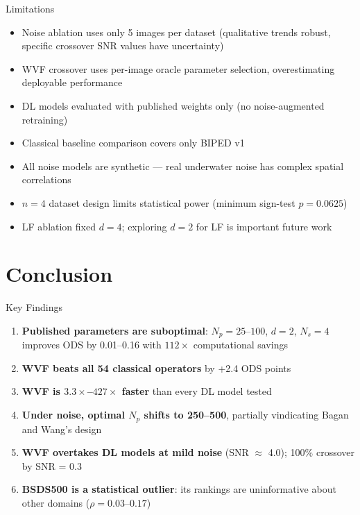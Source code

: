 \documentclass[10pt, aspectratio=169]{beamer}
\begin{document}
\begin{frame}{Limitations}
  \begin{itemize}
    \item Noise ablation uses only 5 images per dataset (qualitative trends robust, specific crossover SNR values have uncertainty)
    \item WVF crossover uses per-image oracle parameter selection, overestimating deployable performance
    \item DL models evaluated with published weights only (no noise-augmented retraining)
    \item Classical baseline comparison covers only BIPED v1
    \item All noise models are synthetic --- real underwater noise has complex spatial correlations
    \item $n = 4$ dataset design limits statistical power (minimum sign-test $p = 0.0625$)
    \item LF ablation fixed $d = 4$; exploring $d = 2$ for LF is important future work
  \end{itemize}
\end{frame}

\sectionsubtitle{}
\section{Conclusion}

\begin{frame}{Key Findings}
  \begin{enumerate}
    \item \textbf{Published parameters are suboptimal}: $N_p = 25$--$100$, $d = 2$, $N_s = 4$ improves ODS by 0.01--0.16 with $112\times$ computational savings
    \item \textbf{WVF beats all 54 classical operators} by +2.4 ODS points
    \item \textbf{WVF is $3.3\times$--$427\times$ faster} than every DL model tested
    \item \textbf{Under noise, optimal $N_p$ shifts to 250--500}, partially vindicating Bagan and Wang's design
    \item \textbf{WVF overtakes DL models at mild noise} (SNR $\approx$ 4.0); 100\% crossover by SNR = 0.3
    \item \textbf{BSDS500 is a statistical outlier}: its rankings are uninformative about other domains ($\rho = 0.03$--$0.17$)
  \end{enumerate}
\end{frame}
\end{document}
